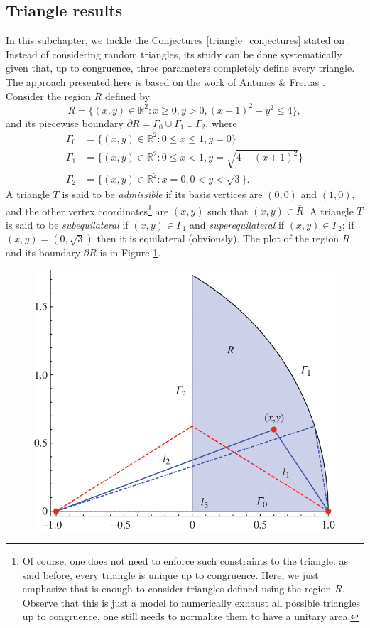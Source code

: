 \subsection{Triangle results}

In this subchapter, we tackle the Conjectures \ref{triangle_conjectures} stated on \cite{vu2023spectral}. Instead of considering random triangles, its study can be done systematically given that, up to congruence, three parameters completely define every triangle. The approach presented here is based on the work of Antunes \& Freitas \cite{antunes2011inverse}. Consider the region \(R\) defined by
\[
    R = \{(x, y) \in \mathbb{R}^2: x \geq 0, y > 0, (x+1)^2 + y^2 \leq 4\},
\]
and its piecewise boundary \(\partial R = \Gamma_0 \cup \Gamma_1 \cup \Gamma_2\), where
\begin{align*}
    \Gamma_0 &= \{(x,y) \in \mathbb{R}^2: 0 \leq x \leq 1, y=0\}\\
    \Gamma_1 &= \{(x,y) \in \mathbb{R}^2: 0 \leq x < 1, y=\sqrt{4-(x+1)^2}\}\\
    \Gamma_2 &= \{(x,y) \in \mathbb{R}^2: x=0, 0 < y < \sqrt{3}\}.
\end{align*}
A triangle \(T\) is said to be \textit{admissible} if its basis vertices are \((0, 0)\) and \((1, 0)\), and the other vertex coordinates\footnote{Of course, one does not need to enforce such constraints to the triangle: as said before, every triangle is unique up to congruence. Here, we just emphasize that is enough to consider triangles defined using the region \(R\). Observe that this is just a model to numerically exhaust all possible triangles up to congruence, one still needs to normalize them to have a unitary area.} are \((x,y)\) such that \((x,y) \in \overline{R}\). A triangle \(T\) is said to be \textit{subequilateral} if \((x, y) \in \Gamma_1\) and \textit{superequilateral} if \((x, y) \in \Gamma_2\); if \((x, y) = (0, \sqrt{3})\) then it is equilateral (obviously). The plot of the region \(R\) and its boundary \(\partial R\) is in Figure \ref{dirac_triangle_model}.
\begin{figure}[!htb]
    \centering
    \includegraphics[width=0.5\linewidth]{Images/Dirac/model_triangle.png}
    \label{dirac_triangle_model}
\end{figure}

